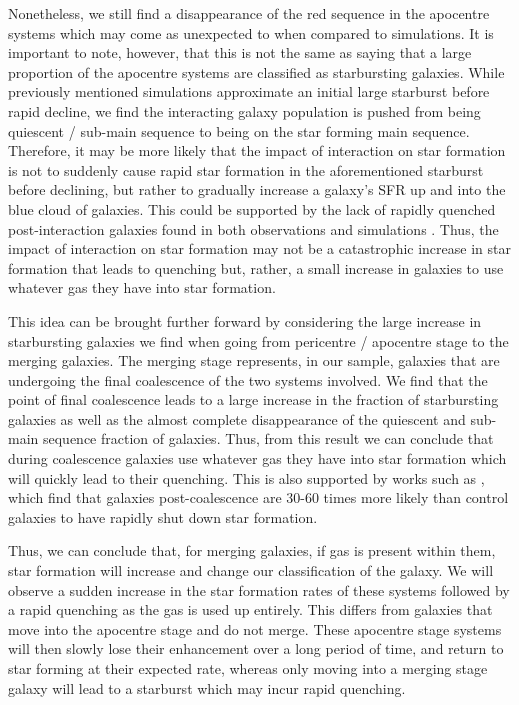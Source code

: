 Nonetheless, we still find a disappearance of the red sequence in the apocentre systems which may come as unexpected to when compared to simulations. It is important to note, however, that this is not the same as saying that a large proportion of the apocentre systems are classified as starbursting galaxies. While previously mentioned simulations approximate an initial large starburst before rapid decline, we find the interacting galaxy population is pushed from being quiescent / sub-main sequence to being on the star forming main sequence. Therefore, it may be more likely that the impact of interaction on star formation is not to suddenly cause rapid star formation in the aforementioned starburst before declining, but rather to gradually increase a galaxy's SFR up and into the blue cloud of galaxies. This could be supported by the lack of rapidly quenched post-interaction galaxies found in both observations \citep{2017ApJ...845..145W} and simulations \citep{2020MNRAS.493.3716H, 2021MNRAS.504.1888Q}. Thus, the impact of interaction on star formation may not be a catastrophic increase in star formation that leads to quenching but, rather, a small increase in galaxies to use whatever gas they have into star formation. %

This idea can be brought further forward by considering the large increase in starbursting galaxies we find when going from pericentre / apocentre stage to the merging galaxies. The merging stage represents, in our sample, galaxies that are undergoing the final coalescence of the two systems involved. We find that the point of final coalescence leads to a large increase in the fraction of starbursting galaxies as well as the almost complete disappearance of the quiescent and sub-main sequence fraction of galaxies. Thus, from this result we can conclude that during coalescence galaxies use whatever gas they have into star formation which will quickly lead to their quenching. This is also supported by works such as \citet{2022MNRAS.517L..92E}, which find that galaxies post-coalescence are 30-60 times more likely than control galaxies to have rapidly shut down star formation.

Thus, we can conclude that, for merging galaxies, if gas is present within them, star formation will increase and change our classification of the galaxy. We will observe a sudden increase in the star formation rates of these systems followed by a rapid quenching as the gas is used up entirely. This differs from galaxies that move into the apocentre stage and do not merge. These apocentre stage systems will then slowly lose their enhancement over a long period of time, and return to star forming at their expected rate, whereas only moving into a merging stage galaxy will lead to a starburst which may incur rapid quenching.

